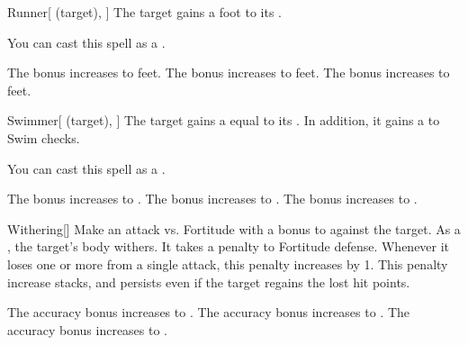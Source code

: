 \lowercase{\hypertarget{spell:Runner}{}}\label{spell:Runner}
\begin{attuneability}[Rank 2]{\hypertarget{spell:Runner}{Runner}}[ (target), ]
The target gains a  foot  to its .

You can cast this spell as a .

\rankline
{} The bonus increases to  feet.
 The bonus increases to  feet.
 The bonus increases to  feet.
\end{attuneability}
\vspace{0.25em}



\lowercase{\hypertarget{spell:Swimmer}{}}\label{spell:Swimmer}
\begin{attuneability}[Rank 2]{\hypertarget{spell:Swimmer}{Swimmer}}[ (target), ]
The target gains a  equal to its .
In addition, it gains a   to Swim checks.

You can cast this spell as a .

\rankline
{} The bonus increases to .
 The bonus increases to .
 The bonus increases to .
\end{attuneability}
\vspace{0.25em}



\lowercase{\hypertarget{spell:Withering}{}}\label{spell:Withering}
\begin{freeability}[Rank 2]{\hypertarget{spell:Withering}{Withering}}[]
Make an attack vs. Fortitude with a  bonus to  against the target.
\hit As a , the target's body withers.
It takes a  penalty to Fortitude defense.
Whenever it loses one or more  from a single attack, this penalty increases by 1.
This penalty increase stacks, and persists even if the target regains the lost hit points.

\rankline
{} The accuracy bonus increases to .
 The accuracy bonus increases to .
 The accuracy bonus increases to .
\end{freeability}
\vspace{0.25em}



